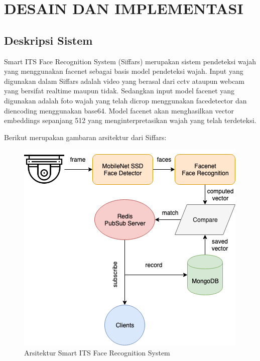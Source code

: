 \chapter{DESAIN DAN IMPLEMENTASI}


\section{Deskripsi Sistem}

Smart ITS Face Recognition System (Siffars) merupakan sistem pendeteksi wajah yang menggunakan facenet sebagai basis model pendeteksi wajah.
Input yang digunakan dalam Siffars adalah video yang berasal dari cctv ataupun webcam yang bersifat realtime maupun tidak. 
Sedangkan input model facenet yang digunakan adalah foto wajah yang telah dicrop menggunakan facedetector dan diencoding menggunakan base64.
Model facenet akan menghasilkan vector embeddings sepanjang 512 yang menginterpretasikan wajah yang telah terdeteksi.

Berikut merupakan gambaran arsitektur dari Siffars:

\begin{figure} [ht] \centering
  \includegraphics[scale=0.4]{gambar/sfa.png}
  \caption{Arsitektur Smart ITS Face Recognition System}
  \label{fig:SpaceShuttle}
\end{figure}

